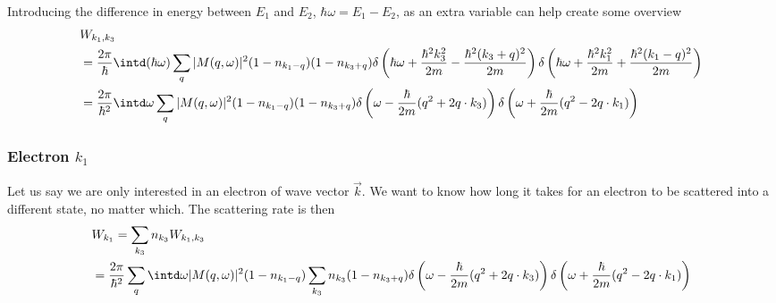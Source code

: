 \documentclass[physics,phd,nolot,nolof]{uccthesis}%
\begin{document}
{Introducing the difference in energy between $E_1$ and $E_2$,
$\hbar \omega = E_1 -E_2 $, as an extra variable can help 
create some overview
\begin{equation}
  \begin{split}
  &W_{k_1,k_3} \\
  & = \frac{2\pi}{\hbar}
  \intd(\hbar\omega )\sum_{q}
  |M(q, \omega)|^2
 (1-n_{k_1-q})(1-n_{k_3+q})
 \delta\left(
 \hbar \omega + \frac{\hbar^2 k_3^2}{2 m} -\frac{\hbar^2 (k_3 + q)^2}{2 m}
 \right)
 \delta\left(
 \hbar \omega + \frac{\hbar^2 k_1^2}{2 m} +\frac{\hbar^2 (k_1 - q)^2}{2 m}
 \right)
 \\
 & = \frac{2\pi}{\hbar^2}
 \intd\omega\sum_{q}
  |M(q, \omega)|^2
 (1-n_{k_1-q})(1-n_{k_3+q})
 \delta\left(
 \omega -\frac{\hbar}{2 m}(q^2 + 2q\cdot k_3)
 \right)
 \delta\left(
 \omega +\frac{\hbar}{2 m}(q^2 - 2q\cdot k_1)
 \right)
  \label{eq:e-e-fermi-golden-rule}
  \end{split}
\end{equation}
\subsubsection{Electron $k_1$}
Let us say we are only interested in an electron of wave vector $\vec k$. 
We want to know how long it takes for an electron to be scattered into 
a different state, no matter which. 
The scattering rate is then
\begin{equation}
\begin{split}
 & W_{k_1} 
  = \sum_{k_3} n_{k_3} W_{k_1,k_3}\\
 & = \frac{2\pi}{\hbar^2}\sum_{q}
\intd\omega
  |M(q, \omega)|^2
  (1-n_{k_1-q})
\sum_{k_3} n_{k_3} (1-n_{k_3+q})
\delta\left(
 \omega -\frac{\hbar}{2 m}(q^2 + 2q\cdot k_3)
 \right)
 \delta\left(
 \omega +\frac{\hbar}{2 m}(q^2 - 2q\cdot k_1)
 \right)
\end{split}
\label{eq:W_k1}
\end{equation}

}
\end{document}
